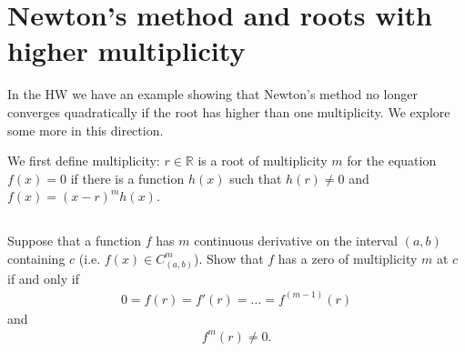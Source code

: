 \documentclass[11pt,letterpaper]{report}
\begin{document}




\section{Newton's method and roots with higher multiplicity}
In the HW we have an example showing that Newton's method no longer converges quadratically if the root has higher than one multiplicity. We explore some more in this direction.

We first define multiplicity: $r\in \mathbb{R}$ is a root of multiplicity $m$ for the equation $f(x)=0$ if there is a function $h(x)$ such that $h(r)\neq 0$ and $f(x) = (x-r)^m h(x)$.

\subsection{}
Suppose that a function $f$ has $m$ continuous derivative on the interval $(a,b)$ containing $c$ (i.e. $f(x)\in C^m_{(a,b)}$). Show that $f$ has a zero of multiplicity $m$ at $c$ if and only if
\begin{align*}
    0 = f(r) = f'(r) = \dots = f^{(m-1)}(r)
\end{align*}
and
\begin{align*}
    f^{m}(r) \neq 0.
\end{align*}
\end{document}
